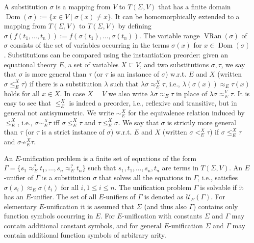\documentclass[10pt,a4paper]{amsart}
\begin{document}
A substitution $\sigma$ is a mapping from $V$ to $T(\Sigma,V)$ that has a finite domain $\operatorname{Dom}(\sigma):=\{x\in V\mid\sigma(x)\neq x\}$. It can be homomorphically extended to a mapping from $T(\Sigma,V)$ to $T(\Sigma,V)$ by defining $\sigma(f(t_{1},\ldots,t_{n})):=f(\sigma(t_{1}),\ldots,\sigma(t_{n}))$. The variable range $\operatorname{VRan}(\sigma)$ of $\sigma$ consists of the set of variables occurring in the terms $\sigma(x)$ for $x\in\operatorname{Dom}(\sigma)$. Substitutions can be compared using the instantiation preorder: given an equational theory $E$, a set of variables $X\subseteq V$, and two substitutions $\sigma,\tau$, we say that $\sigma$ is more general than $\tau$ (or $\tau$ is an instance of $\sigma$) w.r.t. $E$ and $X$ (written $\sigma\leq_{E}^{X}\tau$) if there is a substitution $\lambda$ such that $\lambda\sigma\approx_{E}^{X}\tau$, i.e., $\lambda(\sigma(x))\approx_{E}\tau(x)$ holds for all $x\in X$. In case $X=V$ we also write $\lambda\sigma\approx_{E}\tau$ in place of $\lambda\sigma\approx_{E}^{V}\tau$. It is easy to see that $\leq_{E}^{X}$ is indeed a preorder, i.e., reflexive and transitive, but in general not antisymmetric. We write $\sim_{E}^{X}$ for the equivalence relation induced by $\leq_{E}^{X}$, i.e., $\sigma\sim_{E}^{X}\tau$ iff $\sigma\leq^{X}_{E}\tau$ and $\tau\leq^{X}_{E}\sigma$. We say that $\sigma$ is strictly more general than $\tau$ (or $\tau$ is a strict instance of $\sigma$) w.r.t. $E$ and $X$ (written $\sigma<_{E}^{X}\tau$) if $\sigma\leq_{E}^{X}\tau$ and $\sigma\not\sim_{E}^{X}\tau$.\par
 
 
 
An $E$-unification problem is a finite set of equations of the form $\Gamma=\{s_{1}\approx_{E}^{?}t_{1},\ldots,s_{n}\approx_{E}^{?}t_{n}\}$ such that $s_{1},t_{1},\ldots,s_{n},t_{n}$ are terms in $T(\Sigma,V)$. An $E$-unifier of $\Gamma$ is a substitution $\sigma$ that solves all the equations in $\Gamma$, i.e., satisfies $\sigma(s_{i})\approx_{E}\sigma(t_{i})$ for all $i,1\leq i\leq n$. The unification problem $\Gamma$ is solvable if it has an $E$-unifier. The set of all $E$-unifiers of $\Gamma$ is denoted as $\mathcal{U}_{E}(\Gamma)$. For elementary $E$-unification it is assumed that $\Sigma$ (and thus also $\Gamma$) contains only function symbols occurring in $E$. For $E$-unification with constants $\Sigma$ and $\Gamma$ may contain additional constant symbols, and for general $E$-unification $\Sigma$ and $\Gamma$ may contain additional function symbols of arbitrary arity.\par
 
\end{document}
